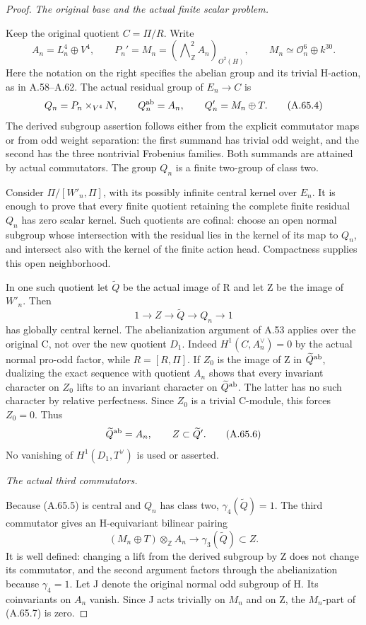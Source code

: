 \begin{proof}
\emph{The original base and the actual finite scalar problem.}\par
Keep the original quotient \(C=\Pi/R\). Write
\[
 A_n=L_n^4\oplus V^4,\qquad
 P_n'=M_n=(\bigwedge\nolimits^2_{\mathbb Z}A_n)_{O^2(H)},
 \qquad M_n\simeq\mathcal O_n^6\oplus k^{30}.
 \tag{A.65.3}
\]
Here the notation on the right specifies the abelian group and its
trivial H-action, as in A.58--A.62. The actual residual group of
\(E_n\to C\) is
\[
 Q_n=P_n\mathbin{\times}_{V^4}N,
 \qquad Q_n^{\rm ab}=A_n,
 \qquad Q_n'=M_n\oplus T.
 \tag{A.65.4}
\]
The derived subgroup assertion follows either from the explicit
commutator maps or from odd weight separation: the first summand
has trivial odd weight, and the second has the three nontrivial
Frobenius families. Both summands are attained by actual commutators.
The group \(Q_n\) is a finite two-group of class two.

Consider \(\Pi/[W'_n,\Pi]\), with its possibly infinite central
kernel over \(E_n\). It is enough to prove that every finite
quotient retaining the complete finite residual \(Q_n\) has zero
scalar kernel. Such quotients are cofinal: choose an open normal
subgroup whose intersection with the residual lies in the kernel
of its map to \(Q_n\), and intersect also with the kernel of the
finite action head. Compactness supplies this open neighborhood.

In one such quotient let \(\widetilde Q\) be the actual image of R
and let Z be the image of \(W'_n\). Then
\[
 1\longrightarrow Z\longrightarrow\widetilde Q
 \longrightarrow Q_n\longrightarrow1
 \tag{A.65.5}
\]
has globally central kernel. The abelianization argument of A.53
applies over the original C, not over the new quotient \(D_1\).
Indeed \(H^1(C,A_n^\vee)=0\) by the actual normal pro-odd factor,
while \(R=[R,\Pi]\). If \(Z_0\) is the image of Z in
\(\widetilde Q^{\rm ab}\), dualizing the exact sequence with
quotient \(A_n\) shows that every invariant character on \(Z_0\)
lifts to an invariant character on \(\widetilde Q^{\rm ab}\).
The latter has no such character by relative perfectness. Since
\(Z_0\) is a trivial C-module, this forces \(Z_0=0\). Thus
\[
 \widetilde Q^{\rm ab}=A_n,
 \qquad Z\subset\widetilde Q'.
 \tag{A.65.6}
\]
No vanishing of \(H^1(D_1,T^\vee)\) is used or asserted.

\emph{The actual third commutators.}\par
Because (A.65.5) is central and \(Q_n\) has class two,
\(\gamma_4(\widetilde Q)=1\). The third commutator gives an
H-equivariant bilinear pairing
\[
 (M_n\oplus T)\otimes_{\mathbb Z} A_n
       \longrightarrow\gamma_3(\widetilde Q)\subset Z.
 \tag{A.65.7}
\]
It is well defined: changing a lift from the derived subgroup by
Z does not change its commutator, and the second argument factors
through the abelianization because \(\gamma_4=1\).
Let J denote the original normal odd subgroup of H. Its coinvariants
on \(A_n\) vanish. Since J acts trivially on \(M_n\) and on Z,
the \(M_n\)-part of (A.65.7) is zero.


\end{proof}
